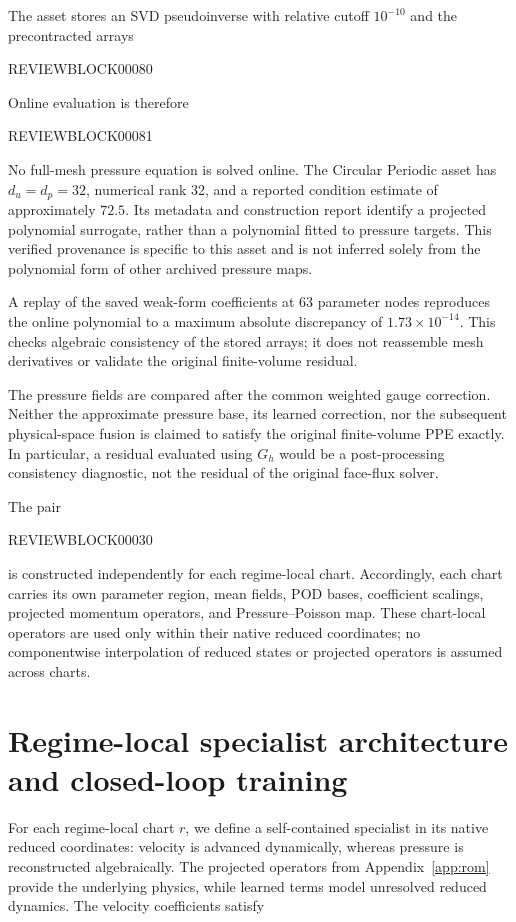 \documentclass{article}
\begin{document}
The asset stores an SVD pseudoinverse with relative cutoff $10^{-10}$ and the precontracted arrays


REVIEWBLOCK00080


Online evaluation is therefore


REVIEWBLOCK00081


No full-mesh pressure equation is solved online. The Circular Periodic asset has $d_u=d_p=32$, numerical rank 32, and a reported condition estimate of approximately $72.5$. Its metadata and construction report identify a projected polynomial surrogate, rather than a polynomial fitted to pressure targets. This verified provenance is specific to this asset and is not inferred solely from the polynomial form of other archived pressure maps.

A replay of the saved weak-form coefficients at 63 parameter nodes reproduces the online polynomial to a maximum absolute discrepancy of $1.73\times10^{-14}$. This checks algebraic consistency of the stored arrays; it does not reassemble mesh derivatives or validate the original finite-volume residual.

The pressure fields are compared after the common weighted gauge correction. Neither the approximate pressure base, its learned correction, nor the subsequent physical-space fusion is claimed to satisfy the original finite-volume PPE exactly. In particular, a residual evaluated using $G_h$ would be a post-processing consistency diagnostic, not the residual of the original face-flux solver.

The pair


REVIEWBLOCK00030


is constructed independently for each regime-local chart.
Accordingly, each chart carries its own parameter region, mean fields,
POD bases, coefficient scalings, projected momentum operators, and
Pressure--Poisson map.
These chart-local operators are used only within their native reduced
coordinates; no componentwise interpolation of reduced states or projected
operators is assumed across charts.


\section{Regime-local specialist architecture and closed-loop training}
\label{app:specialists}

For each regime-local chart $r$, we define a self-contained 
specialist in its native reduced coordinates: velocity is advanced
dynamically, whereas pressure is reconstructed algebraically.
The projected operators from Appendix~\ref{app:rom} provide the underlying physics, while learned terms model unresolved reduced dynamics. The velocity coefficients satisfy
\end{document}
